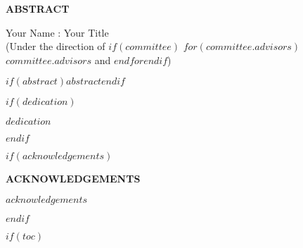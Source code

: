 \documentclass[$if(fontsize)$$fontsize$,$endif$,letterpaper,twoside]{report}
\begin{document}
\begin{center}
\vspace*{52pt}
{\Large \textbf{ABSTRACT}}
\vspace{11pt}

\begin{singlespace}
Your Name : Your Title \\
(Under the direction of $if(committee)$ $for(committee.advisors)$ $committee.advisors$ and $endfor$$endif$)
\end{singlespace}
\end{center}

$if(abstract)$$abstract$$endif$

\clearpage


$if(dedication)$
\begin{center}
\vspace*{52pt}

\singlespacing

$dedication$

\end{center}

\pagebreak
$endif$


$if(acknowledgements)$
\begin{center}
\vspace*{52pt}
{\Large \textbf{ACKNOWLEDGEMENTS}}
\end{center}

$acknowledgements$

\clearpage
$endif$


$if(toc)$
\renewcommand{\contentsname}{TABLE OF CONTENTS}
\renewcommand{\cfttoctitlefont}{\Large\bfseries}
\renewcommand{\cftaftertoctitle}{\hfill}
\renewcommand{\cftdotsep}{1.5}
\cftsetrmarg{1.0in}
\end{document}
